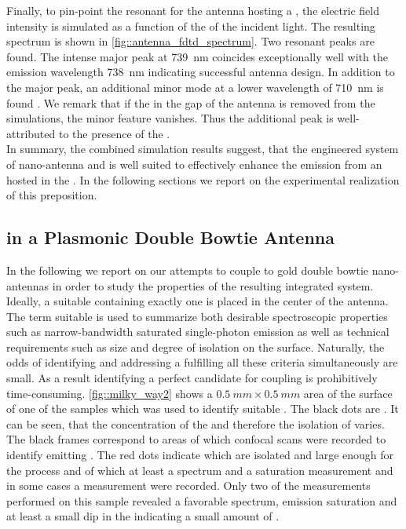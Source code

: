 		Finally, to pin-point the resonant \wl for the antenna hosting a \nd, the electric field intensity is simulated as a function of the \wl of the incident light. The resulting spectrum is shown in \autoref{fig::antenna_fdtd_spectrum}. Two resonant peaks are found. The intense major peak at \SI{739}{nm} coincides exceptionally well with the \siv emission wavelength \SI{738}{nm} indicating successful antenna design. In addition to the major peak, an additional minor mode at a lower wavelength of \SI{710}{nm} is found \cite{Rahbany2016}. We remark that if the \nd in the gap of the antenna is removed from the simulations, the minor feature vanishes. Thus the additional peak is well-attributed to the presence of the \nd.
		\\
		In summary, the combined simulation results suggest, that the engineered system of nano-antenna and \nd is well suited to effectively enhance the emission from an \siv hosted in the \nd. In the following sections we report on the experimental realization of this preposition.

	\subsection{\siv in a Plasmonic Double Bowtie Antenna}

		In the following we report on our attempts to couple \sivs to gold double bowtie nano-antennas in order to study the properties of the resulting integrated system. Ideally, a suitable \nd containing exactly one \siv is placed in the center of the antenna. The term suitable is used to summarize both desirable spectroscopic properties such as narrow-bandwidth saturated single-photon emission as well as technical requirements such as \nd size and degree of isolation on the surface. Naturally, the odds of identifying and addressing a \nd fulfilling all these criteria simultaneously are small. 
		As a result identifying a perfect candidate for coupling is prohibitively time-consuming. 
		\autoref{fig::milky_way2} shows a $\SI{0.5}{mm}\times\SI{0.5}{mm}$ area of the surface of one of the samples which was used to identify suitable \nds.
		The black dots are \nds.
		It can be seen, that the concentration of the \nds and therefore the isolation of \nds varies.
		The black frames correspond to areas of which confocal scans were recorded to identify \nds emitting \fl.
		The red dots indicate \nds which are isolated and large enough for the \pp process and of which at least a \pl spectrum and a saturation measurement and in some cases a \gt measurement were recorded.
		Only two of the measurements performed on this sample revealed a favorable spectrum, emission saturation and at least a small dip in the \gtf indicating a small amount of \sivs.

